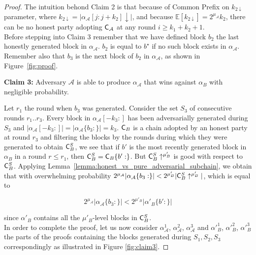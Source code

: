 \begin{proof}
	The intuition behond Claim 2 is that because of Common Prefix on $k_{2\downarrow}$ parameter, where
	$k_{2\downarrow} = \vert \alpha_\mathcal{A}[j:j+k_2]\downarrow\vert$, and because
	$\mathbb{E}[k_{2\downarrow}] = 2^{\mu_\mathcal{A}}k_2$, there can be no honest party adopting
	$\mathsf{C}_\mathcal{A}$ at any round $i \geq k_1 + k_2 + 1$. \\

Before stepping into Claim 3 remember that we have defined block $b_2$ the last honestly generated block in $\alpha_\mathcal{A}$. $b_2$ is equal to $b^\star$ if no such block exists in $\alpha_\mathcal{A}$. Remember also that $b_3$ is the next block of $b_2$ in $\alpha_\mathcal{A}$, as shown in Figure~\ref{fig:proof}.

	\noindent
	\textbf{Claim 3:} Adversary $\mathcal{A}$ is able to produce $\alpha_\mathcal{A}$ that wins against $\alpha_B$ with negligible probability.

	\noindent
	Let $r_1$ the round when $b_3$ was generated.
	Consider the set $S_3$ of consecutive rounds $r_1..r_3$. Every block in
	$\alpha_\mathcal{A}[-k_3:]$ has been adversarially generated during $S_3$ and $\vert
	\alpha_\mathcal{A}[-k_3:] \vert = \vert \alpha_\mathcal{A}\{b_3:\} \vert = k_3$. $\mathsf{C}_B$ is a chain
	adopted by an honest party at round $r_3$ and filtering the blocks by the rounds
	during which they were generated to obtain $\mathsf{C}_B^S$, we see that if $b'$ is the
	most recently generated block in $\alpha_B$ in a round $r \leq r_1$, then $\mathsf{C}_B^S =
	\mathsf{C}_B\{ b': \}$. But $\mathsf{C}_B^S \uparrow^{\mu'_B}$ is good with respect to $\mathsf{C}_B^S$.
	Applying Lemma~\ref{lemma:honest_vs_pure_adversarial_subchain}, we obtain that with overwhelming probability  $2^{\mu_\mathcal{A}} \vert
	\alpha_\mathcal{A}\{b_3:\} \vert < 2^{\mu'_B} \vert \mathsf{C}_B^S \uparrow^{\mu'_B} \vert$, which is
	equal to

	\begin{equation}
	2^{\mu_\mathcal{A}} \vert \alpha_\mathcal{A}\{b_3:\} \vert < 2^{\mu'_B} \vert \alpha'_B\{b':\} \vert
	\end{equation} 

	since $\alpha'_B$ contains all the $\mu'_B$-level blocks in $\mathsf{C}_B^S$. \\

	In order to complete the proof, let us now consider $\alpha_\mathcal{A}^{1}$,
	$\alpha_\mathcal{A}^{2}$, $\alpha_\mathcal{A}^{3}$ and $\alpha'^1_B$, $\alpha'^2_B$,
	$\alpha'^3_B$ the parts of the proofs containing the blocks generated during $S_1, S_2, S_3$ correspondingly as illustrated in Figure \ref{fig:claim3}.


\end{proof}
